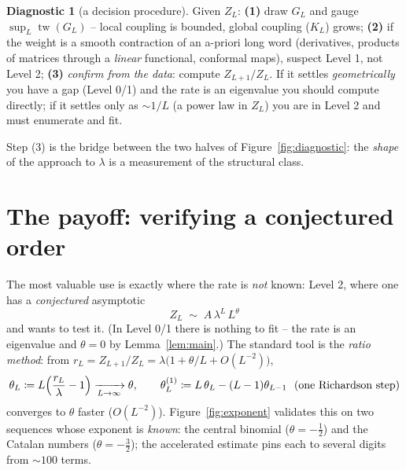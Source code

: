 \documentclass[11pt]{article}
\newcommand{\tw}{\operatorname{tw}}
\newcommand{\eqdef}{\coloneqq}
\theoremstyle{plain}
\theoremstyle{definition}
\newtheorem{principle}[lemma]{Diagnostic}
\begin{document}
\begin{principle}[a decision procedure]
\label{diag:procedure}
Given $Z_L$:
\textbf{(1)} draw $G_L$ and gauge $\sup_L\tw(G_L)$ -- local coupling is bounded,
global coupling ($K_L$) grows;
\textbf{(2)} if the weight is a smooth contraction of an a-priori long word
(derivatives, products of matrices through a \emph{linear} functional, conformal
maps), suspect Level 1, not Level 2;
\textbf{(3)} \emph{confirm from the data}: compute $Z_{L+1}/Z_L$. If it settles
\emph{geometrically} you have a gap (Level 0/1) and the rate is an eigenvalue you
should compute directly; if it settles only as $\sim1/L$ (a power law in $Z_L$)
you are in Level 2 and must enumerate and fit.
\end{principle}

Step (3) is the bridge between the two halves of Figure~\ref{fig:diagnostic}:
the \emph{shape} of the approach to $\lambda$ is a measurement of the structural
class.

\section{The payoff: verifying a conjectured order}

The most valuable use is exactly where the rate is \emph{not} known: Level 2,
where one has a \emph{conjectured} asymptotic
\begin{equation}
\label{eq:ansatz}
   Z_L\;\sim\;A\,\lambda^{L}\,L^{\theta}
\end{equation}
and wants to test it. (In Level 0/1 there is nothing to fit -- the rate is an
eigenvalue and $\theta=0$ by Lemma~\ref{lem:main}.) The standard tool is the
\emph{ratio method}: from $r_L=Z_{L+1}/Z_L=\lambda\bigl(1+\theta/L+O(L^{-2})\bigr)$,
\begin{equation}
\label{eq:ratio}
   \theta_L\eqdef L\Bigl(\frac{r_L}{\lambda}-1\Bigr)\xrightarrow[L\to\infty]{}\theta,
   \qquad
   \theta_L^{(1)}\eqdef L\,\theta_L-(L-1)\theta_{L-1}\ \ (\text{one Richardson step})
\end{equation}
converges to $\theta$ faster ($O(L^{-2})$). Figure~\ref{fig:exponent} validates
this on two sequences whose exponent is \emph{known}: the central binomial
($\theta=-\tfrac12$) and the Catalan numbers ($\theta=-\tfrac32$); the
accelerated estimate pins each to several digits from $\sim100$ terms.
\end{document}
